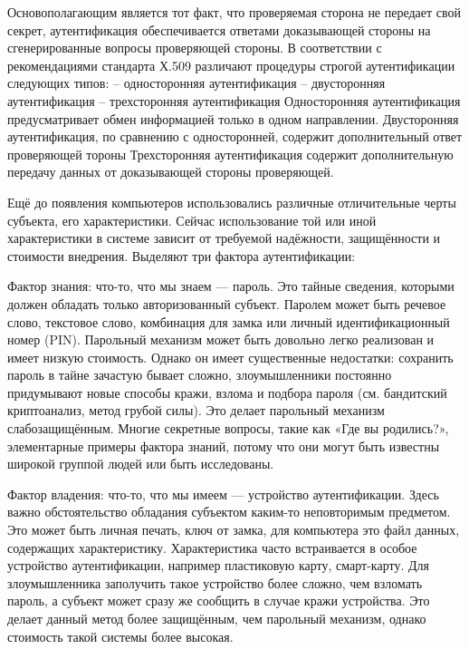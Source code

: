 Основополагающим является тот факт, что проверяемая сторона не передает свой секрет, аутентификация обеспечивается ответами доказывающей стороны на сгенерированные вопросы проверяющей стороны.
В соответствии с рекомендациями стандарта Х.509 различают процедуры строгой аутентификации следующих типов:
– односторонняя аутентификация – двусторонняя аутентификация – трехсторонняя аутентификация
Односторонняя аутентификация предусматривает обмен информацией только в одном направлении.
Двусторонняя аутентификация, по сравнению с односторонней, содержит дополнительный ответ проверяющей тороны %
Трехсторонняя аутентификация содержит дополнительную передачу данных от доказывающей стороны проверяющей.

Ещё до появления компьютеров использовались различные отличительные черты субъекта, его характеристики. Сейчас использование той или иной характеристики в системе зависит от требуемой надёжности, защищённости и стоимости внедрения. Выделяют три фактора аутентификации:

Фактор знания: что-то, что мы знаем — пароль. Это тайные сведения, которыми должен обладать только авторизованный субъект. Паролем может быть речевое слово, текстовое слово, комбинация для замка или личный идентификационный номер (PIN). Парольный механизм может быть довольно легко реализован и имеет низкую стоимость. Однако он имеет существенные недостатки: сохранить пароль в тайне зачастую бывает сложно, злоумышленники постоянно придумывают новые способы кражи, взлома и подбора пароля (см. бандитский криптоанализ, метод грубой силы). Это делает парольный механизм слабозащищённым. Многие секретные вопросы, такие как «Где вы родились?», элементарные примеры фактора знаний, потому что они могут быть известны широкой группой людей или быть исследованы.

Фактор владения: что-то, что мы имеем — устройство аутентификации. Здесь важно обстоятельство обладания субъектом каким-то неповторимым предметом. Это может быть личная печать, ключ от замка, для компьютера это файл данных, содержащих характеристику. Характеристика часто встраивается в особое устройство аутентификации, например пластиковую карту, смарт-карту. Для злоумышленника заполучить такое устройство более сложно, чем взломать пароль, а субъект может сразу же сообщить в случае кражи устройства. Это делает данный метод более защищённым, чем парольный механизм, однако стоимость такой системы более высокая.

